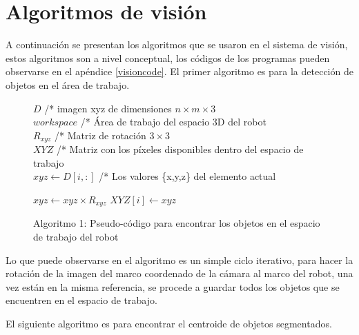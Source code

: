     \section{Algoritmos de visión}
    A continuación se presentan los algoritmos que se usaron en el sistema de visión, estos algoritmos son a nivel conceptual, los códigos de los programas pueden observarse en el apéndice \ref{visioncode}. El primer algoritmo es para la detección de objetos en el área de trabajo.
    \begin{figure}[h]
    	\centering
    	\begin{algorithmic}
    		\REQUIRE $ D $ /* imagen xyz de dimensiones $n \times m \times 3$ \\
    		
    		
    			\REQUIRE $ workspace $ /* Área de trabajo del espacio 3D del robot \\
    			
    			
    			\REQUIRE $ R_{xyz} $ /* Matriz de rotación $3\times 3$ \\
    			
    			
    			\ENSURE $XYZ$ /* Matriz con los píxeles disponibles dentro del espacio de trabajo\\
    		\STATE $xyz \leftarrow  D[i,:]$ /* Los valores \{x,y,z\} del elemento actual
    		
    		\STATE $xyz \leftarrow xyz \times R_{xyz}$
    		\STATE $XYZ[i] \leftarrow xyz$
    		\ENDIF
    		\ENDFOR
    	\end{algorithmic}
    	\caption{Algoritmo 1: Pseudo-código para encontrar los objetos en el espacio de trabajo del robot}
    	\label{alg1}
    \end{figure} 
    Lo que puede observarse en el algoritmo es un simple ciclo iterativo, para hacer la rotación de la imagen del marco coordenado de la cámara al marco del robot, una vez están en la misma referencia, se procede a guardar todos los objetos que se encuentren en el espacio de trabajo.
    
    El siguiente algoritmo es para encontrar el centroide de objetos segmentados.
    
